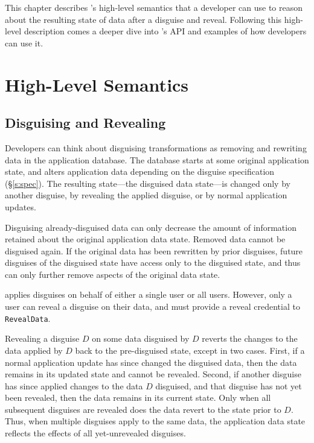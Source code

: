 This chapter describes \sys's high-level semantics that a developer can use to
reason about the resulting state of data after a disguise and reveal. Following
this high-level description comes a deeper dive into \sys's API and examples of
how developers can use it.

\section{High-Level Semantics}
\label{s:hlsemantics}

\subsection{Disguising and Revealing}
Developers can think about disguising transformations as removing and rewriting
data in the application database.
%
The database starts at some original application state, and alters application
data depending on the disguise specification (\S\ref{s:spec}).  The resulting
state---the disguised data state---is changed only by another disguise, by
revealing the applied disguise, or by normal application updates.
%

%
Disguising already-disguised data can only decrease the amount of information
retained about the original application data state. Removed data cannot be
disguised again. If the original data has been rewritten by prior disguises,
future disguises of the disguised state have access only to the disguised state,
and thus can only further remove aspects of the original data state.
%

%
\sys applies disguises on behalf of either a single user or all users. However,
only a user can reveal a disguise on their data, and must provide a reveal
credential to \texttt{RevealData}.
%

%
Revealing a disguise $D$ on some data disguised by $D$ reverts the changes to
the data applied by $D$ back to the pre-disguised state, except in two cases.
First, if a normal application update has since changed the disguised data, then
the data remains in its updated state and cannot be revealed.
%
Second, if another disguise has since applied changes to the data $D$ disguised,
and that disguise has not yet been revealed, then the data remains in its
current state.
%
Only when all subsequent disguises are revealed does the data revert to the
state prior to $D$.
%
Thus, when multiple disguises apply to the same data, the application data state
reflects the effects of all yet-unrevealed disguises.
%

